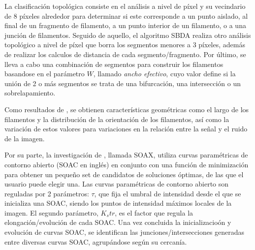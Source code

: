 La clasificaci\'on topol\'ogica consiste en el an\'alisis a nivel de p\'ixel y su vecindario de 8 p\'ixeles alrededor para determinar si este corresponde a un punto aislado, al final de un fragmento de filamento, a un punto interior de un filamento, o a una junci\'on de filamentos. Seguido de aquello, el algoritmo SBDA realiza otro an\'alisis topol\'ogico a nivel de p\'ixel que borra los segmentos menores a 3 p\'ixeles, adem\'as de realizar los calculos de distancia de cada segmento/fragmento. Por último, se lleva a cabo una combinaci\'on de segmentos para construir los filamentos basandose en el par\'ametro $W$, llamado \textit{ancho efectivo}, cuyo valor define si la uni\'on de 2 o m\'as segmentos se trata de una bifurcaci\'on, una intersecci\'on o un sobrelapamiento. 

Como resultados de \cite{qiu2014quantitative}, se obtienen caracter\'isticas geom\'etricas como el largo de los filamentos y la distribuci\'on de la orientaci\'on de los filamentos, as\'i como la variaci\'on de estos valores para variaciones en la relaci\'on entre la se\~nal y el ruido de la imagen.

Por su parte, la investigaci\'on de \cite{xu2015soax}, llamada SOAX, utiliza curvas param\'etricas de contorno abierto (SOAC en ingl\'es) en conjunto con una funci\'on de minimizaci\'on para obtener un peque\~no set de candidatos de soluciones \'optimas, de las que el usuario puede elegir una. Las curvas param\'etricas de contorno abierto son reguladas por 2 par\'ametros: $\tau$, que fija el umbral de intensidad desde el que se inicializa una SOAC, siendo los puntos de intensidad m\'aximos locales de la imagen. El segundo par\'ametro, $K_str$, es el factor que regula la elongaci\'on/evoluci\'on de cada SOAC. Una vez concluida la inicializacio\'on y evoluci\'on de curvas SOAC, se identifican las junciones/intersecciones generadas entre diversas curvas SOAC, agrup\'andose seg\'un su cercan\'ia.  

